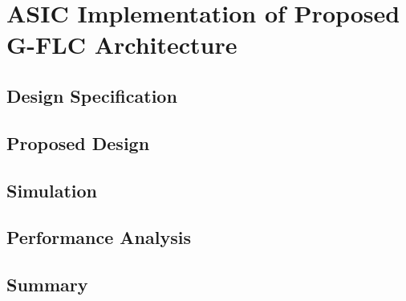 \chapter{ASIC Implementation of Proposed G-FLC Architecture}
\lipsum

\section{Design Specification}
\lipsum

\section{Proposed Design}
\lipsum

\section{Simulation}
\lipsum


\section{Performance Analysis}
\lipsum

\section{Summary}
\lipsum


